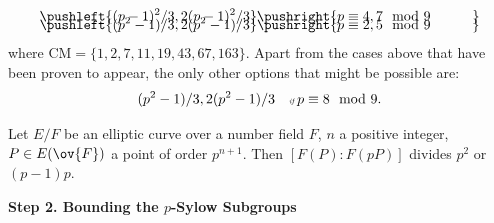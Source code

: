 \begin{frame}[plain]
\begin{thm}
\begin{align}
	\pushleft{(p - 1)^2/3, 2(p - 1)^2/3} &  \pushright{p \equiv 4, 7 \mod 9 \quad\quad\quad} \label{12} \\[-1em]
	\pushleft{(p^2 - 1)/3, 2(p^2 - 1)/3} &  \pushright{p \equiv 2, 5 \mod 9 \quad\quad\quad} \label{13}
	\end{align}
where $\text{CM}= \{ 1, 2, 7, 11, 19, 43, 67, 163 \}$. Apart from the cases above that have been proven to appear, the only other options that might be possible are:
	\begin{equation} \label{14}
	(p^2 - 1)/3, 2(p^2 - 1)/3 \quad \text{\tiny\itshape if } p \equiv 8 \mod 9.
	\end{equation}
\end{thm}
\end{frame}





\begin{frame}[plain]
\begin{thm} 
Let $E/F$ be an elliptic curve over a number field $F$, $n$ a positive integer, $P \in E(\ov{F})$ a point of order $p^{n+1}$. Then $[F(P) \colon F(pP)]$ divides $p^2$ or $(p - 1)p$.
\end{thm}
\end{frame}





\begin{frame}[plain]
\vfill
\begin{center} {\bfseries \Large \textcolor{UniGray}{Step 2. Bounding the $p$-Sylow Subgroups}} \end{center}
\vfill 
\end{frame}





